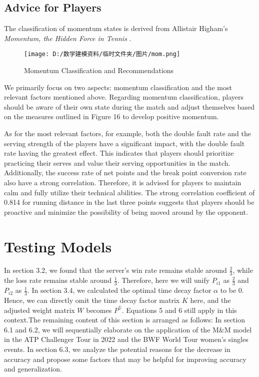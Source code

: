 \documentclass{mcmthesis}
\begin{document}
\subsection{Advice for Players}
The classification of momentum states is derived from Allistair Higham's \textit{Momentum, the Hidden Force in Tennis} \cite{3}.

\begin{figure}[H]
	\small
	\centering
	\texttt{[image: D:/数学建模资料/临时文件夹/图片/mom.png]}
	\caption{Momentum Classification and Recommendations} \label{fig:aa}
\end{figure}
We primarily focus on two aspects: momentum classification and the most relevant factors mentioned above.
Regarding momentum classification, players should be aware of their own state during the match and adjust themselves based on the measures outlined in Figure 16 to develop positive momentum.

As for the most relevant factors, for example, both the double fault rate and the serving strength of the players have a significant impact, with the double fault rate having the greatest effect. This indicates that players should prioritize practicing their serves and value their serving opportunities in the match. Additionally, the success rate of net points and the break point conversion rate also have a strong correlation. Therefore, it is advised for players to maintain calm and fully utilize their technical abilities. The strong correlation coefficient of 0.814 for running distance in the last three points suggests that players should be proactive and minimize the possibility of being moved around by the opponent.
\section{Testing Models}
In section 3.2, we found that the server's win rate remains stable around $\frac{2}{3}$, while the loss rate remains stable around $\frac{1}{3}$. Therefore, here we will unify $P_{i1}$ as $\frac{2}{3}$ and $P_{i2}$ as $\frac{1}{3}$. In section 3.4, we calculated the optimal time decay factor $\alpha$ to be $0$. Hence, we can directly omit the time decay factor matrix $K$ here, and the adjusted weight matrix $W$ becomes $P^\mathbb{S}$. Equations 5 and 6 still apply in this context.The remaining content of this section is arranged as follows:
In section 6.1 and 6.2, we will sequentially elaborate on the application of the M\&M model in the ATP Challenger Tour in 2022 and the BWF World Tour women's singles events. In section 6.3, we analyze the potential reasons for the decrease in accuracy and propose some factors that may be helpful for improving accuracy and generalization.
\end{document}
